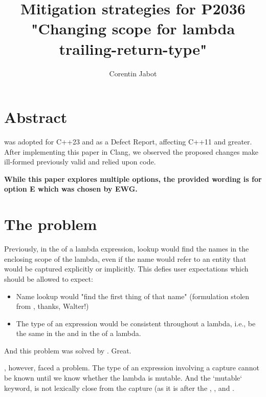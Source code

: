 \documentclass{wg21}
\title{Mitigation strategies for P2036 "Changing scope for lambda trailing-return-type"}
\author{Corentin Jabot}{corentin.jabot@gmail.com}
\begin{document}
\maketitle

\section{Abstract}

 was adopted for C++23 and as a Defect Report, affecting C++11 and greater.
After implementing this paper in Clang, we observed the proposed changes make ill-formed previously valid and relied upon
code.

\textbf{While this paper explores multiple options, the provided wording is for option E which was chosen by EWG.}

\section{The problem}

Previously, in the  of a lambda expression, lookup would find the names in the enclosing scope of the lambda,
even if the name would refer to an entity that would be captured explicitly or implicitly.
This defies user expectations which should be allowed to expect:
\begin{itemize}
    \item Name lookup would "find the first thing of that name" (formulation stolen from , thanks, Walter!)
    \item The type of an expression would be consistent throughout a lambda, i.e., be the same in the  and in the
     of a lambda.
\end{itemize}

And this problem was solved by . Great.

, however, faced a problem.
The type of an expression involving a capture cannot be known until we know whether the lambda is mutable.
And the `mutable` keyword, is not lexically close from the capture (as it is after the
, , 
and .
\end{document}
